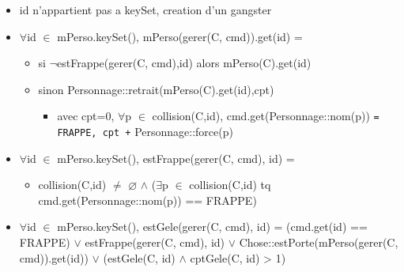 \documentclass[11pt]{article}
\begin{document}
\begin{itemize}

\item id n'appartient pas a keySet, creation d'un gangster\\
\label{sec-1.7.3.1}


\item $\forall$id $\in$ mPerso.keySet(), mPerso(gerer(C, cmd)).get(id) =\\
\label{sec-1.7.3.2}

\begin{itemize}

\item si $\neg$estFrappe(gerer(C, cmd),id) alors mPerso(C).get(id)\\
\label{sec-1.7.3.2.1}


\item sinon Personnage::retrait(mPerso(C).get(id),cpt)\\
\label{sec-1.7.3.2.2}

\begin{itemize}

\item avec cpt=0, $\forall$p $\in$ collision(C,id), cmd.get(Personnage::nom(p)) \texttt{= FRAPPE, cpt +} Personnage::force(p)\\
\label{sec-1.7.3.2.2.1}


\end{itemize} %
\end{itemize} %

\item $\forall$id $\in$ mPerso.keySet(), estFrappe(gerer(C, cmd), id) =\\
\label{sec-1.7.3.3}

\begin{itemize}

\item collision(C,id) $\neq$ $\varnothing$ $\wedge$ ($\exists$p $\in$ collision(C,id) tq cmd.get(Personnage::nom(p)) == FRAPPE)\\
\label{sec-1.7.3.3.1}


\end{itemize} %

\item $\forall$id $\in$ mPerso.keySet(), estGele(gerer(C, cmd), id) = (cmd.get(id) == FRAPPE) $\vee$ estFrappe(gerer(C, cmd), id) $\vee$ Chose::estPorte(mPerso(gerer(C, cmd)).get(id)) $\vee$ (estGele(C, id) $\wedge$ cptGele(C, id) > 1)\\
\label{sec-1.7.3.4}




\end{itemize}
\end{document}

